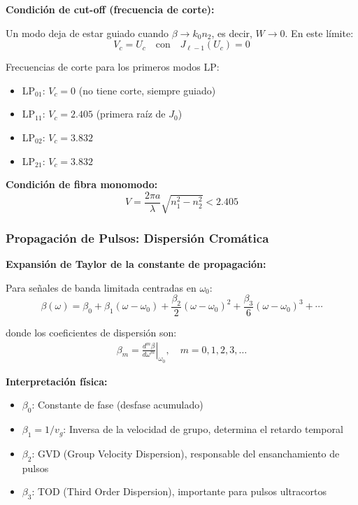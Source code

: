 \documentclass[11pt,a4paper]{article}
\begin{document}
\begin{importante}
\textbf{Condición de cut-off (frecuencia de corte):}

Un modo deja de estar guiado cuando $\beta \to k_0 n_2$, es decir, $W \to 0$. En este límite:
\begin{equation}
    V_c = U_c \quad \text{con} \quad J_{\ell-1}(U_c) = 0
\end{equation}

Frecuencias de corte para los primeros modos LP:
\begin{itemize}
    \item LP$_{01}$: $V_c = 0$ (no tiene corte, siempre guiado)
    \item LP$_{11}$: $V_c = 2.405$ (primera raíz de $J_0$)
    \item LP$_{02}$: $V_c = 3.832$
    \item LP$_{21}$: $V_c = 3.832$
\end{itemize}

\textbf{Condición de fibra monomodo:}
\begin{equation}
    V = \frac{2\pi a}{\lambda}\sqrt{n_1^2 - n_2^2} < 2.405
\end{equation}
\end{importante}

\subsubsection{Propagación de Pulsos: Dispersión Cromática}

\textbf{Expansión de Taylor de la constante de propagación:}

Para señales de banda limitada centradas en $\omega_0$:
\begin{equation}
    \beta(\omega) = \beta_0 + \beta_1(\omega - \omega_0) + \frac{\beta_2}{2}(\omega - \omega_0)^2 + \frac{\beta_3}{6}(\omega - \omega_0)^3 + \cdots
\end{equation}

donde los coeficientes de dispersión son:
\begin{align}
    \beta_m = \left.\frac{d^m\beta}{d\omega^m}\right|_{\omega_0}, \quad m = 0, 1, 2, 3, \ldots
\end{align}

\textbf{Interpretación física:}
\begin{itemize}
    \item $\beta_0$: Constante de fase (desfase acumulado)
    \item $\beta_1 = 1/v_g$: Inversa de la velocidad de grupo, determina el retardo temporal
    \item $\beta_2$: GVD (Group Velocity Dispersion), responsable del ensanchamiento de pulsos
    \item $\beta_3$: TOD (Third Order Dispersion), importante para pulsos ultracortos
\end{itemize}
\end{document}
